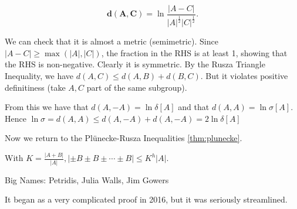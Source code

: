 \documentclass[a4paper]{article}
\begin{document}
\begin{definition}
	\[
		\bm{d(A,C)} = \ln \frac{|A-C|}{|A|^{\frac{1}{2}}|C|^{\frac{1}{2}}  }
	.\]
\end{definition}

We can check that it is almost a metric (semimetric).
Since $|A-C| \ge \max(|A|,|C|) $, the fraction in the RHS is at least 1, showing that the RHS is non-negative.
Clearly it is symmetric.
By the Rusza Triangle Inequality, we have $d(A,C) \le d(A,B) + d(B,C) $.
But it violates positive definitiness (take $A,C $ part of the same subgroup).

From this we have that $d(A,-A) = \ln \delta[A] $ and that $d(A,A) = \ln \sigma [A] $.
Hence $\ln \sigma = d(A,A) \le d(A,-A) + d(A,-A) = 2\ln \delta [A] $

Now we return to the Pl\"unecke-Rusza Inequalities \ref{thm:plunecke}.

\begin{thm}
	With $K = \frac{|A+B|}{|A|}, |\pm B \pm B \pm \cdots \pm B| \le K^{h}|A|  $.
\end{thm}

Big Names: Petridis, Julia Walls, Jim Gowers

It began as a very complicated proof in 2016, but it was seriously streamlined.
\end{document}

